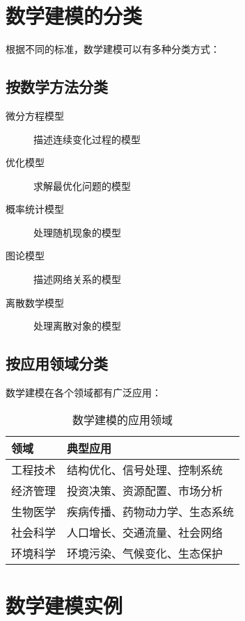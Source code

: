 \section{数学建模的分类}\label{sec:modeling-types}

根据不同的标准，数学建模可以有多种分类方式：

\subsection{按数学方法分类}

\begin{description}
    \item[微分方程模型] 描述连续变化过程的模型
    \item[优化模型] 求解最优化问题的模型
    \item[概率统计模型] 处理随机现象的模型
    \item[图论模型] 描述网络关系的模型
    \item[离散数学模型] 处理离散对象的模型
\end{description}

\subsection{按应用领域分类}

数学建模在各个领域都有广泛应用：

\begin{table}[htbp]
    \centering
    \caption{数学建模的应用领域}
    \label{tab:application-areas}
    \begin{tabular}{@{}ll@{}}
        \toprule
        领域 & 典型应用 \\
        \midrule
        工程技术 & 结构优化、信号处理、控制系统 \\
        经济管理 & 投资决策、资源配置、市场分析 \\
        生物医学 & 疾病传播、药物动力学、生态系统 \\
        社会科学 & 人口增长、交通流量、社会网络 \\
        环境科学 & 环境污染、气候变化、生态保护 \\
        \bottomrule
    \end{tabular}
\end{table}

\section{数学建模实例}\label{sec:modeling-example}

